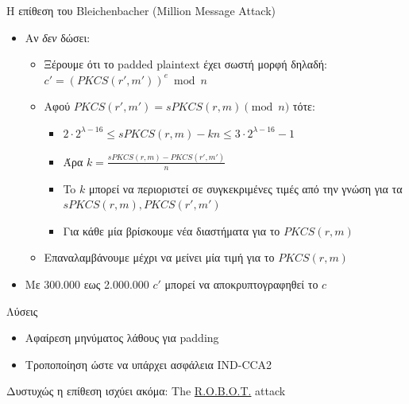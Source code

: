 \documentclass[handout]{beamer}
\begin{document}
\begin{frame}[allowframebreaks]{Η επίθεση του Bleichenbacher (Million Message Attack)}
\framebreak

\begin{itemize}
\item Αν \emph{δεν} δώσει:
\begin{itemize} 
\item Ξέρουμε ότι το padded plaintext έχει σωστή μορφή δηλαδή: $c' = (PKCS(r',m'))^e \bmod{n}$
\item Αφού $PKCS(r',m') = sPKCS(r,m) \pmod{n}$ τότε:
\begin{itemize}
	\item $2 \cdot 2^{\lambda-16} \leq sPKCS(r,m) - kn \leq 3 \cdot 2^{\lambda-16} -1$ 
	\item Άρα $k=\frac{sPKCS(r,m)-PKCS(r',m')}{n}$
	\item To $k$ μπορεί να περιοριστεί σε συγκεκριμένες τιμές από την γνώση για τα $sPKCS(r,m), PKCS(r',m')$
	\item Για κάθε μία βρίσκουμε νέα διαστήματα για το $PKCS(r,m)$
\end{itemize}
\item Επαναλαμβάνουμε μέχρι να μείνει μία τιμή για το $PKCS(r,m)$
\end{itemize} 
\item Με 300.000 εως 2.000.000 $c'$ μπορεί να αποκρυπτογραφηθεί το $c$ 
\end{itemize}

\begin{block}{Λύσεις}
\begin{itemize}
    \item Αφαίρεση μηνύματος λάθους για padding
    \item Τροποποίηση ώστε να υπάρχει ασφάλεια IND-CCA2 
\end{itemize}

\alert{Δυστυχώς η επίθεση ισχύει ακόμα: The \href{https://robotattack.org/}{R.O.B.O.T.} attack}
\end{block}


\end{frame}
\end{document}
